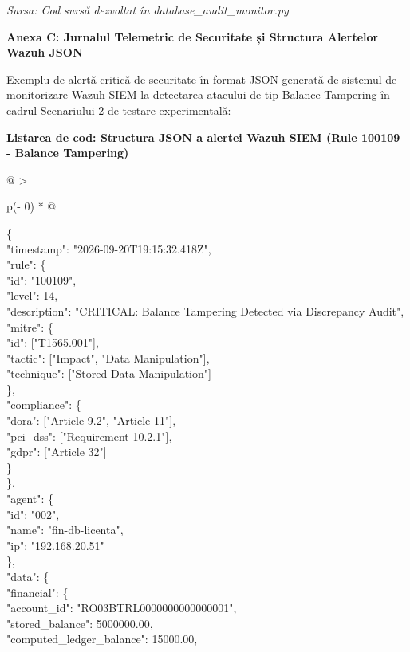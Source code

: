 \documentclass[
]{article}
\begin{document}
\emph{Sursa: Cod sursă dezvoltat în database\_audit\_monitor.py}

\textbf{Anexa C: Jurnalul Telemetric de Securitate și Structura
Alertelor Wazuh JSON}

Exemplu de alertă critică de securitate în format JSON generată de
sistemul de monitorizare Wazuh SIEM la detectarea atacului de tip
Balance Tampering în cadrul Scenariului 2 de testare experimentală:

\textbf{Listarea de cod: Structura JSON a alertei Wazuh SIEM (Rule
100109 - Balance Tampering)}

\begin{longtable}[]{@{}
  >{\raggedright\arraybackslash}p{(\columnwidth - 0\tabcolsep) * }@{}}
\toprule\noalign{}
\begin{minipage}[b]{\linewidth}\raggedright
\{\\
"timestamp": "2026-09-20T19:15:32.418Z",\\
"rule": \{\\
"id": "100109",\\
"level": 14,\\
"description": "CRITICAL: Balance Tampering Detected via Discrepancy
Audit",\\
"mitre": \{\\
"id": {[}"T1565.001"{]},\\
"tactic": {[}"Impact", "Data Manipulation"{]},\\
"technique": {[}"Stored Data Manipulation"{]}\\
\},\\
"compliance": \{\\
"dora": {[}"Article 9.2", "Article 11"{]},\\
"pci\_dss": {[}"Requirement 10.2.1"{]},\\
"gdpr": {[}"Article 32"{]}\\
\}\\
\},\\
"agent": \{\\
"id": "002",\\
"name": "fin-db-licenta",\\
"ip": "192.168.20.51"\\
\},\\
"data": \{\\
"financial": \{\\
"account\_id": "RO03BTRL0000000000000001",\\
"stored\_balance": 5000000.00,\\
"computed\_ledger\_balance": 15000.00,\\

\end{minipage}
\end{longtable}
\end{document}
